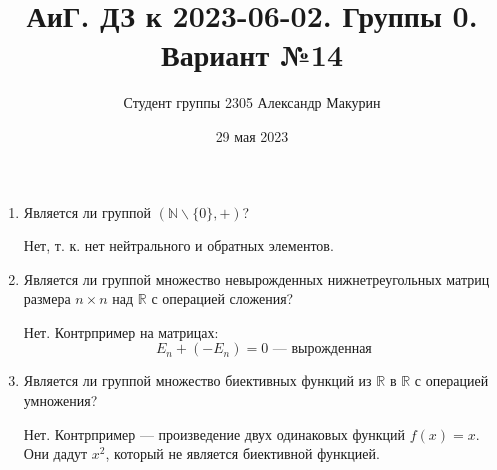 \documentclass[12pt]{article}
\title{АиГ. ДЗ к 2023-06-02. Группы 0. Вариант №14}
\author{Студент группы 2305 Александр Макурин}
\date{29 мая 2023}
\begin{document}
\maketitle
\section{}
\begin{enumerate}[label=\alph*)]
    \item Является ли группой $(\mathbb{N} \backslash \{0\}, +)$?

          Нет, т. к. нет нейтрального и обратных элементов.
    \item Является ли группой множество невырожденных нижнетреугольных матриц размера $n \times n$ над $\mathbb{R}$ с операцией сложения?

          Нет. Контрпример на матрицах:
          \[
              E_n + (-E_n) = 0 \text{ — вырожденная}
          \]
    \item Является ли группой множество биективных функций из $\mathbb{R}$ в $\mathbb{R}$ с операцией умножения?

          Нет. Контрпример — произведение двух одинаковых функций $f(x) = x$. Они дадут $x^2$, который не является биективной функцией.
\end{enumerate}
\end{document}
